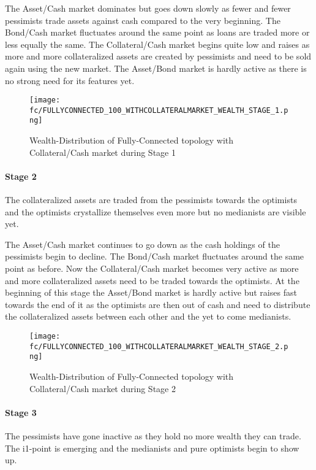 \documentclass[Bachelorarbeit.tex]{subfiles}
\begin{document}
\medskip

The Asset/Cash market dominates but goes down slowly as fewer and fewer pessimists trade assets against cash compared to the very beginning. 
The Bond/Cash market fluctuates around the same point as loans are traded more or less equally the same.
The Collateral/Cash market begins quite low and raises as more and more collateralized assets are created by pessimists and need to be sold again using the new market.
The Asset/Bond market is hardly active as there is no strong need for its features yet.

\begin{figure}[H]
	\centering
  \texttt{[image: fc/FULLYCONNECTED\_100\_WITHCOLLATERALMARKET\_WEALTH\_STAGE\_1.png]}
  	\caption{Wealth-Distribution of Fully-Connected topology with Collateral/Cash market during Stage 1}
	\label{fig:markets_FULLYCONNECTED_100_WITHCOLLATERALMARKET_WEALTH_STAGE_1}
\end{figure}

\paragraph{Stage 2}
The collateralized assets are traded from the pessimists towards the optimists and the optimists crystallize themselves even more but no medianists are visible yet.

\medskip

The Asset/Cash market continues to go down as the cash holdings of the pessimists begin to decline. The Bond/Cash market fluctuates around the same point as before. Now the Collateral/Cash market becomes very active as more and more collateralized assets need to be traded towards the optimists.
At the beginning of this stage the Asset/Bond market is hardly active but raises fast towards the end of it as the optimists are then out of cash and need to distribute the collateralized assets between each other and the yet to come medianists.

\begin{figure}[H]
	\centering
  \texttt{[image: fc/FULLYCONNECTED\_100\_WITHCOLLATERALMARKET\_WEALTH\_STAGE\_2.png]}
  	\caption{Wealth-Distribution of Fully-Connected topology with Collateral/Cash market during Stage 2}
	\label{fig:markets_FULLYCONNECTED_100_WITHCOLLATERALMARKET_WEALTH_STAGE_2}
\end{figure}

\paragraph{Stage 3}
The pessimists have gone inactive as they hold no more wealth they can trade. The i1-point is emerging and the medianists and pure optimists begin to show up.
\end{document}
